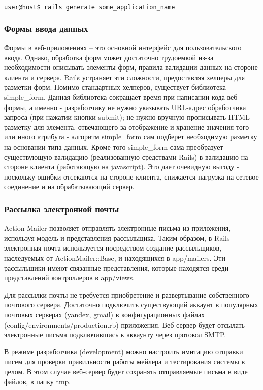 \begin{lstlisting}[language=Bash,caption=Создание
нового приложения,label={lst:rails_new_application}] 
user@host$ rails generate some_application_name
\end{lstlisting}

\subsubsection{Формы ввода данных}
Формы в веб-приложениях – это основной интерфейс для пользовательского ввода.
Однако, обработка форм может достаточно трудоемкой из-за необходимости описывать
элементы форм, правила валидации данных на стороне клиента и сервера. Rails
устраняет эти сложности, предоставляя хелперы для разметки форм. Помимо
стандартных хелперов, существует библиотека simple\_form. Данная библиотека
сокращает время при написании кода веб-формы, а именно - разработчику не нужно
указывать URL-адрес обработчика запроса (при нажатии кнопки submit); не нужно
вручную прописывать HTML-разметку для элемента, отвечающего за отображение и
хранение значения того или иного атрибута - алгоритм simple\_form сам подберет
необходимую разметку на основании типа данных. Кроме того simple\_form сама
преобразует существующую валидацию (реализованную средствами Rails) в валидацию
на стороне клиента (работающую на javascript). Это дает очевидную выгоду -
поскольку ошибки отсекаются на стороне клиента, снижается нагрузка на сетевое
соединение и на обрабатывающий сервер.

\subsubsection{Рассылка  электронной почты}
Action Mailer позволяет отправлять электронные письма из приложения, используя
модель и представления рассыльщика. Таким образом, в Rails электронная почта
используется посредством создание рассыльщиков, наследуемых от
ActionMailer::Base, и находящихся в app/mailers. Эти рассыльщики имеют связанные
представления, которые находятся среди представлений контроллеров в app/views.

Для рассылки почты не требуется приобретение и развертывание собственного
почтового сервера. Достаточно подключить существующий аккаунт в популярных
почтовых серверах (yandex, gmail) в конфигурационных файлах
(config/environments/production.rb) приложения. Веб-сервер будет отсылать
электронные письма подключившись к аккаунту через протокол SMTP.

В режиме разработчика (development) можно настроить имитацию отправки писем для
проверки правильности работы мейлера и тестирования системы в целом. В этом
случае веб-сервер будет сохранять отправляемые письма в виде файлов, в папку
tmp.


